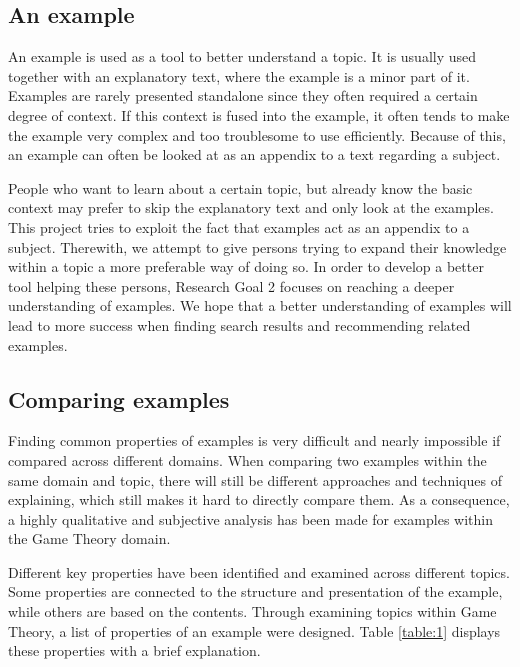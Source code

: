 \subsection{An example}

An example is used as a tool to better understand a topic. It is usually used together with an explanatory text, where the example is a minor part of it. Examples are rarely presented standalone since they often required a certain degree of context. If this context is fused into the example, it often tends to make the example very complex and too troublesome to use efficiently. Because of this, an example can often be looked at as an appendix to a text regarding a subject. 

People who want to learn about a certain topic, but already know the basic context may prefer to skip the explanatory text and only look at the examples. This project tries to exploit the fact that examples act as an appendix to a subject. Therewith, we attempt to give persons trying to expand their knowledge within a topic a more preferable way of doing so. In order to develop a better tool helping these persons, Research Goal 2 focuses on reaching a deeper understanding of examples. We hope that a better understanding of examples will lead to more success when finding search results and recommending related examples.

\subsection{Comparing examples} \label{comparing_examples}

Finding common properties of examples is very difficult and nearly impossible if  compared across different domains. When comparing two examples within the same domain and topic, there will still be different approaches and techniques of explaining, which still makes it hard to directly compare them. As a consequence, a highly qualitative and subjective analysis has been made for examples within the Game Theory domain. 

Different key properties have been identified and examined across different topics. Some properties are connected to the structure and presentation of the example, while others are based on the contents. Through examining topics within Game Theory, a list of properties of an example were designed. Table \ref{table:1} displays these properties with a brief explanation.

